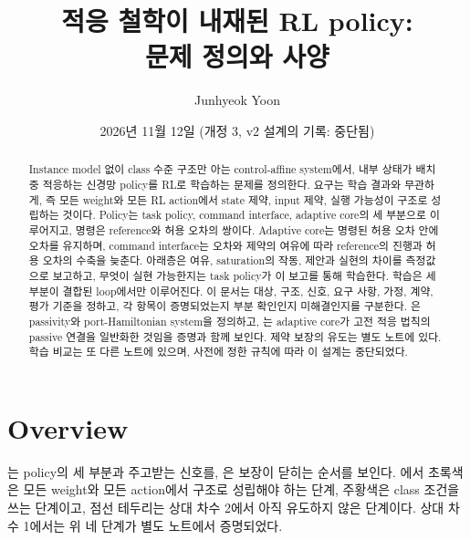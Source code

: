 \documentclass[11pt]{article}\usepackage[margin=1in]{geometry}\usepackage{amsmath,amssymb,amsthm,mathtools}\usepackage{graphicx}\graphicspath{{figures/}{../figures/}{figs/}{./}}\usepackage{enumitem}\usepackage{hyperref}\usepackage{cleveref}\usepackage{tikz}\usetikzlibrary{arrows.meta,positioning,calc,shapes.geometric}\usepackage{float}\usepackage{rotating}\usepackage[most]{tcolorbox}\usepackage{kotex}\usepackage{booktabs}\emergencystretch=1.6em\tolerance=2000 \crefname{assumption}{Assumption}{Assumptions}\Crefname{assumption}{Assumption}{Assumptions}\crefname{definition}{Definition}{Definitions}\Crefname{definition}{Definition}{Definitions}\crefname{proposition}{Proposition}{Propositions}\Crefname{proposition}{Proposition}{Propositions}\crefname{fact}{Fact}{Facts}\Crefname{fact}{Fact}{Facts} \newtheorem{assumption}{Assumption}\newtheorem{definition}{Definition}\newtheorem{lemma}{Lemma}\newtheorem{proposition}{Proposition}\newtheorem{theorem}{Theorem}\newtheorem{corollary}{Corollary}\newtheorem{fact}{Fact}\theoremstyle{remark}\newtheorem{remark}{Remark} \newcommand{\R}{\mathbb{R}}\newcommand{\xb}{\bar x}\newcommand{\Ab}{\bar A}\newcommand{\By}{\bar B_y}\newcommand{\U}{\mathcal U}\newcommand{\Z}{\mathcal Z}
\title{적응 철학이 내재된 RL policy:\\ 문제 정의와 사양}
\author{Junhyeok Yoon}
\date{2026년 11월 12일 (개정 3, v2 설계의 기록: 중단됨)}
\begin{document}
\maketitle

\begin{abstract}
Instance model 없이 class 수준 구조만 아는 control-affine system에서, 내부 상태가 배치 중 적응하는 신경망 policy를 RL로 학습하는 문제를 정의한다. 요구는 학습 결과와 무관하게, 즉 모든 weight와 모든 RL action에서 state 제약, input 제약, 실행 가능성이 구조로 성립하는 것이다. Policy는 task policy, command interface, adaptive core의 세 부분으로 이루어지고, 명령은 reference와 허용 오차의 쌍이다. Adaptive core는 명령된 허용 오차 안에 오차를 유지하며, command interface는 오차와 제약의 여유에 따라 reference의 진행과 허용 오차의 수축을 늦춘다. 아래층은 여유, saturation의 작동, 제안과 실현의 차이를 측정값으로 보고하고, 무엇이 실현 가능한지는 task policy가 이 보고를 통해 학습한다. 학습은 세 부분이 결합된 loop에서만 이루어진다. 이 문서는 대상, 구조, 신호, 요구 사항, 가정, 계약, 평가 기준을 정하고, 각 항목이 증명되었는지 부분 확인인지 미해결인지를 구분한다. 은 passivity와 port-Hamiltonian system을 정의하고, 는 adaptive core가 고전 적응 법칙의 passive 연결을 일반화한 것임을 증명과 함께 보인다. 제약 보장의 유도는 별도 노트에 있다. 학습 비교는 또 다른 노트에 있으며, 사전에 정한 규칙에 따라 이 설계는 중단되었다.
\end{abstract}

\section{Overview}
\label{sec:overview}

는 policy의 세 부분과 주고받는 신호를, 은 보장이 닫히는 순서를 보인다. 에서 초록색은 모든 weight와 모든 action에서 구조로 성립해야 하는 단계, 주황색은 class 조건을 쓰는 단계이고, 점선 테두리는 상대 차수 2에서 아직 유도하지 않은 단계이다. 상대 차수 1에서는 위 네 단계가 별도 노트에서 증명되었다.
\end{document}
